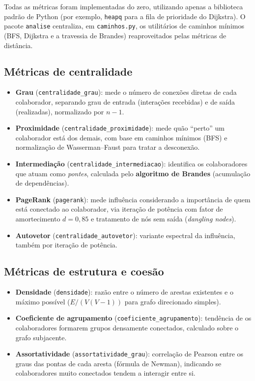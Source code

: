 \documentclass[12pt]{article}
\begin{document}
Todas as métricas foram implementadas do zero, utilizando apenas a biblioteca
padrão de Python (por exemplo, \texttt{heapq}
para a fila de prioridade do Dijkstra). O pacote \texttt{analise} centraliza, em
\texttt{caminhos.py}, os utilitários de caminhos mínimos (BFS, Dijkstra e a
travessia de Brandes) reaproveitados pelas métricas de distância.

\subsection{Métricas de centralidade}

\begin{itemize}
  \item \textbf{Grau} (\texttt{centralidade\_grau}): mede o número de conexões
        diretas de cada colaborador, separando grau de entrada (interações
        recebidas) e de saída (realizadas), normalizado por $n-1$.
  \item \textbf{Proximidade} (\texttt{centralidade\_proximidade}): mede quão
        ``perto'' um colaborador está dos demais, com base em caminhos mínimos
        (BFS) e normalização de Wasserman--Faust para tratar a desconexão.
  \item \textbf{Intermediação} (\texttt{centralidade\_intermediacao}): identifica
        os colaboradores que atuam como \emph{pontes}, calculada pelo
        \textbf{algoritmo de Brandes} (acumulação de dependências).
  \item \textbf{PageRank} (\texttt{pagerank}): mede influência considerando a
        importância de quem está conectado ao colaborador, via iteração de
        potência com fator de amortecimento $d = 0{,}85$ e tratamento de nós sem
        saída (\emph{dangling nodes}).
  \item \textbf{Autovetor} (\texttt{centralidade\_autovetor}): variante espectral
        da influência, também por iteração de potência.
\end{itemize}

\subsection{Métricas de estrutura e coesão}

\begin{itemize}
  \item \textbf{Densidade} (\texttt{densidade}): razão entre o número de arestas
        existentes e o máximo possível ($E / (V(V-1))$ para grafo direcionado
        simples).
  \item \textbf{Coeficiente de agrupamento} (\texttt{coeficiente\_agrupamento}):
        tendência de os colaboradores formarem grupos densamente conectados,
        calculado sobre o grafo subjacente.
  \item \textbf{Assortatividade} (\texttt{assortatividade\_grau}): correlação de
        Pearson entre os graus das pontas de cada aresta (fórmula de Newman),
        indicando se colaboradores muito conectados tendem a interagir entre si.
\end{itemize}
\end{document}
